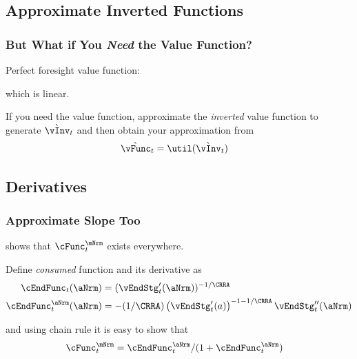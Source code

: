 \documentclass{beamer}
\begin{document}
\subsection{Approximate Inverted Functions}
\begin{frame}%
\frametitle{But What if You {\it Need} the Value Function?}

Perfect foresight value function:

which is linear.  

\medskip\medskip
\pause If you need the value function, approximate the {\it inverted} value function to generate $\grave{\vInv}_{t}$ 
and then obtain your approximation from 
\begin{equation}\begin{gathered}\begin{aligned}
  \grave{\vFunc}_{t}  & = \util(\grave{\vInv}_{t})
\end{aligned}\end{gathered}\end{equation}


\end{frame}

\subsection{Derivatives}
\begin{frame}
\frametitle{Approximate Slope Too}

\cite{BufferStockTheory} shows that $\cFunc^{\mNrm}_{t}$ exists everywhere.
\medskip

\pause 
Define {\it consumed} function and its derivative as 
\begin{equation}\begin{gathered}\begin{aligned}
  \cEndFunc_{t}(\aNrm)  & = (\vEndStg^{\prime}_{t}(\aNrm))^{-1/\CRRA}
\\ \cEndFunc_{t}^{\aNrm}(\aNrm)  & = -(1/\CRRA)\left(\vEndStg_{t}^{\prime}(a)\right)^{-1-1/\CRRA} \vEndStg_{t}^{\prime\prime}(\aNrm) 
\end{aligned}\end{gathered}\end{equation}

\pause 
and using chain rule it is easy to show that
\begin{equation}\begin{gathered}\begin{aligned}
 \cFunc^{\mNrm}_{t}  & = \cEndFunc^{\aNrm}_{t}/(1+\cEndFunc^{\aNrm}_{t})
\end{aligned}\end{gathered}\end{equation}

\end{frame}
\end{document}
